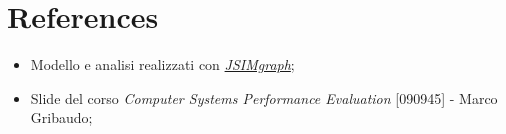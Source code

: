 \documentclass[../main.tex]{subfiles}
\begin{document}
    \chapter{References}\label{ch:references}
    \begin{itemize}
        \item Modello e analisi realizzati con \textit{\href{http://jmt.sourceforge.net/JSIMg.html}{JSIMgraph}};
        \item Slide del corso \textit{Computer Systems Performance Evaluation} [090945] - Marco Gribaudo;
    \end{itemize}
\end{document}
